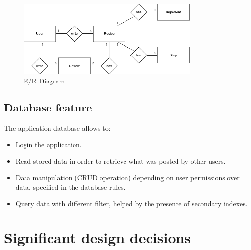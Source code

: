 	\begin{figure}[H]
		\begin{center}
			\centering
			\includegraphics[width=0.8\textwidth]{img/ERDiagram.png}
			\caption{E/R Diagram}
			\label{Fig:ERDiagram}
		\end{center}
	\end{figure}

	\subsection{Database feature}
	The application database allows to:
	
	\begin{itemize}
		\item Login the application.
		\item Read stored data in order to retrieve what was posted by other users.
		\item Data manipulation (CRUD operation) depending on user permissions over data, specified in the database rules.
		\item Query data with different filter, helped by the presence of secondary indexes.
	\end{itemize}
	
	
\section{Significant design decisions}
